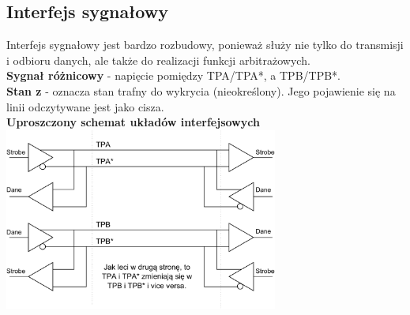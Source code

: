 \subsection{Interfejs sygnałowy}
Interfejs sygnałowy jest bardzo rozbudowy, ponieważ służy nie tylko do transmisji i odbioru danych, ale także do realizacji funkcji arbitrażowych.\\
\textbf{Sygnał różnicowy} - napięcie pomiędzy TPA/TPA*, a TPB/TPB*.\\
\textbf{Stan z} - oznacza stan trafny do wykrycia (nieokreślony). Jego pojawienie się na linii odczytywane jest jako cisza. \\

\textbf{Uproszczony schemat układów interfejsowych}\\
\includegraphics[width=9cm]{./wyklady/Rysunek01.pdf}

